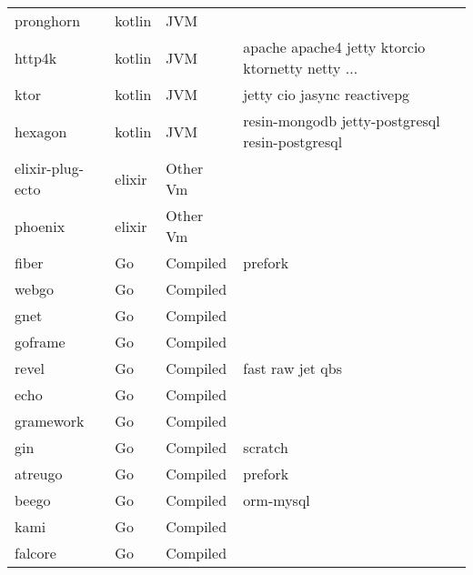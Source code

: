 \begin{longtable}{llll}
    pronghorn        & kotlin      & JVM         &                                                    \\
    http4k           & kotlin      & JVM         & apache apache4 jetty ktorcio ktornetty netty ...   \\
    ktor             & kotlin      & JVM         & jetty cio jasync reactivepg                        \\
    hexagon          & kotlin      & JVM         & resin-mongodb jetty-postgresql resin-postgresql    \\
    elixir-plug-ecto & elixir      & Other Vm    &                                                    \\
    phoenix          & elixir      & Other Vm    &                                                    \\
    fiber            & Go          & Compiled    & prefork                                            \\
    webgo            & Go          & Compiled    &                                                    \\
    gnet             & Go          & Compiled    &                                                    \\
    goframe          & Go          & Compiled    &                                                    \\
    revel            & Go          & Compiled    & fast raw jet qbs                                   \\
    echo             & Go          & Compiled    &                                                    \\
    gramework        & Go          & Compiled    &                                                    \\
    gin              & Go          & Compiled    & scratch                                            \\
    atreugo          & Go          & Compiled    & prefork                                            \\
    beego            & Go          & Compiled    & orm-mysql                                          \\
    kami             & Go          & Compiled    &                                                    \\
    falcore          & Go          & Compiled    &                                                    \\

\end{longtable}
